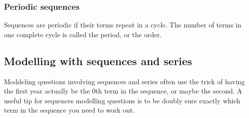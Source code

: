 \subsubsection{Periodic sequences}
Sequences are periodic if their terms repeat in a cycle. The number of terms in one complete cycle is called the period, or the order.

\subsection{Modelling with sequences and series}
Moddeling questions involving sequences and series often use the trick of having the first year actually be the 0th term in the sequence, or maybe the second. A useful tip for sequences modelling questions is to be doubly sure exactly which term in the sequence you need to work out.
